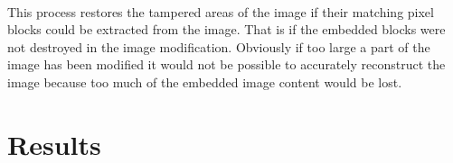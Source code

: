 \documentclass[12pt]{article}
\begin{document}
\hspace{0pt} \\
This process restores the tampered areas of the image if their matching pixel blocks could be extracted from the image. That is if the embedded blocks were not destroyed in the image modification. Obviously if too large a part of the image has been modified it would not be possible to accurately reconstruct the image because too much of the embedded image content would be lost.

\section{Results} 




\end{document}

